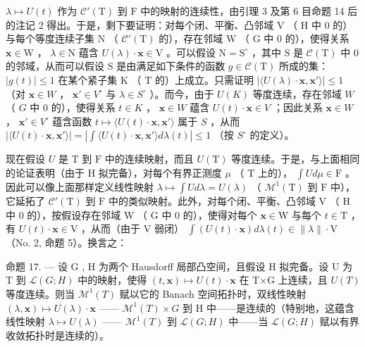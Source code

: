 \(\lambda \mapsto U(t)\) 作为 \(\mathcal{C}'(\mathrm{T})\) 到 \(\mathrm{F}\) 中的映射的连续性，由引理 3 及第 6 目命题 14 后的注记 2 得出。于是，剩下要证明：对每个闭、平衡、凸邻域 \(\mathrm{V}\) （ \(\mathrm{H}\) 中 0 的）与每个等度连续子集 \(\mathrm{N}\) （ \(\mathcal{C}'(\mathrm{T})\) 的），存在邻域 \(\mathrm{W}\) （ \(\mathrm{G}\) 中 0 的），使得关系 \(\mathbf{x} \in \mathrm{W}\) ， \(\lambda \in \mathrm{N}\) 蕴含 \(U(\lambda) \cdot \mathbf{x} \in \mathrm{V}\) 。可以假设 \(\mathrm{N} = \mathrm{S}^{\circ}\) ，其中 \(\mathrm{S}\) 是 \(\mathcal{C}(\mathrm{T})\) 中 0 的邻域，从而可以假设 \(\mathrm{S}\) 是由满足如下条件的函数 \(g \in \mathcal{C}(\mathrm{T})\) 所成的集：\(|g(t)| \leqslant 1\) 在某个紧子集 \(\mathrm{K}\) （ \(\mathrm{T}\) 的）上成立。只需证明 \(|\langle U(\lambda) \cdot \mathbf{x}, \mathbf{x}' \rangle| \leqslant 1\) （对 \(\mathbf{x} \in W\) ， \(\mathbf{x}' \in V^\circ\) 与 \(\lambda \in S^\circ\) ）。而今，由于 \(U(K)\) 等度连续，存在邻域 \(W\) （ \(G\) 中 0 的），使得关系 \(t \in K\) ， \(\mathbf{x} \in W\) 蕴含 \(U(t) \cdot \mathbf{x} \in V\) ；因此关系 \(\mathbf{x} \in W\) ， \(\mathbf{x}' \in V^\circ\) 蕴含函数 \(t \mapsto \langle U(t) \cdot \mathbf{x}, \mathbf{x}' \rangle\) 属于 \(S\) ，从而 \(|\langle U(t) \cdot \mathbf{x}, \mathbf{x}' \rangle| = |\int\langle U(t) \cdot \mathbf{x}, \mathbf{x}' \rangle d\lambda(t)| \leqslant 1\) （按 \(S^\circ\) 的定义）。

现在假设 \(U\) 是 \(\mathrm{T}\) 到 \(\mathrm{F}\) 中的连续映射，而且 \(U(\mathrm{T})\) 等度连续。于是，与上面相同的论证表明（由于 \(\mathrm{H}\) 拟完备），对每个有界正测度 \(\mu\) （ \(\mathrm{T}\) 上的）， \(\int U d\mu \in \mathrm{F}\) 。因此可以像上面那样定义线性映射 \(\lambda \mapsto \int U d\lambda = U(\lambda)\) （ \(\mathcal{M}^1(\mathrm{T})\) 到 \(\mathrm{F}\) 中），它延拓了 \(\mathcal{C}'(\mathrm{T})\) 到 \(\mathrm{F}\) 中的类似映射。此外，对每个闭、平衡、凸邻域 \(\mathrm{V}\) （ \(\mathrm{H}\) 中 0 的），按假设存在邻域 \(\mathrm{W}\) （ \(\mathrm{G}\) 中 0 的），使得对每个 \(\mathbf{x} \in \mathrm{W}\) 与每个 \(t \in \mathrm{T}\) ，有 \(U(t) \cdot \mathbf{x} \in \mathrm{V}\) ，从而（由于 \(\mathrm{V}\) 弱闭） \(\int (U(t) \cdot \mathbf{x}) d\lambda(t) \in \| \lambda \| \cdot \mathrm{V}\) （No. 2, 命题 5）。换言之：

命题 17. --- 设 G , H 为两个 Hausdorff 局部凸空间，且假设 H 拟完备。设 U 为 T 到 \(\mathcal{L}(G;H)\) 中的映射，使得 \((t,\mathbf{x})\mapsto U(t)\cdot \mathbf{x}\) 在 T×G 上连续，且 \(U(T)\) 等度连续。则当 \(\mathcal{M}^1 (T)\) 赋以它的 Banach 空间拓扑时，双线性映射 \((\lambda ,\mathbf{x})\mapsto U(\lambda)\cdot \mathbf{x}\) —— \(\mathcal{M}^1 (T)\times G\) 到 H 中——是连续的（特别地，这蕴含线性映射 \(\lambda \mapsto U(\lambda)\) —— \(\mathcal{M}^1 (T)\) 到 \(\mathcal{L}(G;H)\) 中——当 \(\mathcal{L}(G;H)\) 赋以有界收敛拓扑时是连续的）。

